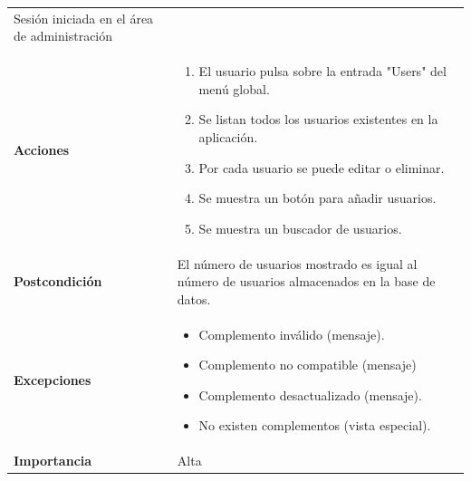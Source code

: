 \documentclass[
]{article}
\providecommand{\tightlist}{%
  \setlength{\itemsep}{0pt}\setlength{\parskip}{0pt}}
\begin{document}
\begin{longtable}[]{@{}ll@{}}
\begin{minipage}[t]{0.73\columnwidth}
Sesión iniciada en el área de administración\strut
\end{minipage}\tabularnewline
\begin{minipage}[t]{0.21\columnwidth}\raggedright
\textbf{Acciones}\strut
\end{minipage} & \begin{minipage}[t]{0.73\columnwidth}\raggedright
\begin{enumerate}
\def\labelenumi{\arabic{enumi}.}
\tightlist
\item
  El usuario pulsa sobre la entrada "Users" del menú global.
\item
  Se listan todos los usuarios existentes en la aplicación.
\item
  Por cada usuario se puede editar o eliminar.
\item
  Se muestra un botón para añadir usuarios.
\item
  Se muestra un buscador de usuarios.
\end{enumerate}\strut
\end{minipage}\tabularnewline
\begin{minipage}[t]{0.21\columnwidth}\raggedright
\textbf{Postcondición}\strut
\end{minipage} & \begin{minipage}[t]{0.73\columnwidth}\raggedright
El número de usuarios mostrado es igual al número de usuarios
almacenados en la base de datos.\strut
\end{minipage}\tabularnewline
\begin{minipage}[t]{0.21\columnwidth}\raggedright
\textbf{Excepciones}\strut
\end{minipage} & \begin{minipage}[t]{0.73\columnwidth}\raggedright
\begin{itemize}
\tightlist
\item
  Complemento inválido (mensaje).
\item
  Complemento no compatible (mensaje)
\item
  Complemento desactualizado (mensaje).
\item
  No existen complementos (vista especial).
\end{itemize}\strut
\end{minipage}\tabularnewline
\begin{minipage}[t]{0.21\columnwidth}\raggedright
\textbf{Importancia}\strut
\end{minipage} & \begin{minipage}[t]{0.73\columnwidth}\raggedright
Alta\strut
\end{minipage}\tabularnewline
\bottomrule
\end{longtable}
\end{document}
